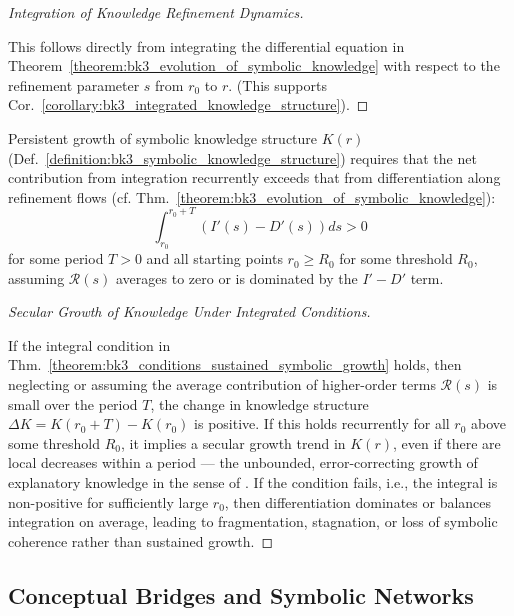 \begin{proof}[Integration of Knowledge Refinement Dynamics]
\label{proof:bk3_integrated_knowledge_dynamics}
\leavevmode

This follows directly from integrating the differential equation in Theorem~\ref{theorem:bk3_evolution_of_symbolic_knowledge} with respect to the refinement parameter $s$ from $r_0$ to $r$. (This supports Cor.~\ref{corollary:bk3_integrated_knowledge_structure}).
\end{proof}

\begin{theorem} \label{theorem:bk3_conditions_sustained_symbolic_growth}
Persistent growth of symbolic knowledge structure $K(r)$ (Def.~\ref{definition:bk3_symbolic_knowledge_structure}) requires that the net contribution from integration recurrently exceeds that from differentiation along refinement flows (cf. Thm.~\ref{theorem:bk3_evolution_of_symbolic_knowledge}):
\[
\int_{r_0}^{r_0+T} (I'(s) - D'(s)) ds > 0
\]
for some period $T > 0$ and all starting points $r_0 \geq R_0$ for some threshold $R_0$, assuming $\mathcal{R}(s)$ averages to zero or is dominated by the $I'-D'$ term.
\end{theorem}

\begin{proof}[Secular Growth of Knowledge Under Integrated Conditions]
\label{proof:bk3_knowledge_growth_integrated_condition}
\leavevmode

If the integral condition in Thm.~\ref{theorem:bk3_conditions_sustained_symbolic_growth} holds, then neglecting or assuming the average contribution of higher-order terms $\mathcal{R}(s)$ is small over the period $T$, the change in knowledge structure $\Delta K = K(r_0+T) - K(r_0)$ is positive. If this holds recurrently for all $r_0$ above some threshold $R_0$, it implies a secular growth trend in $K(r)$, even if there are local decreases within a period --- the unbounded, error-correcting growth of explanatory knowledge in the sense of \citet{deutsch2011infinity}. If the condition fails, i.e., the integral is non-positive for sufficiently large $r_0$, then differentiation dominates or balances integration on average, leading to fragmentation, stagnation, or loss of symbolic coherence rather than sustained growth.
\end{proof}

\subsection{Conceptual Bridges and Symbolic Networks}

